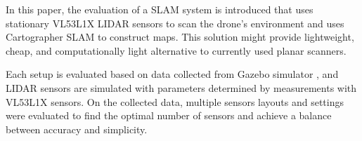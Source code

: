 \documentclass[conference]{IEEEtran}
\begin{document}
In this paper, the evaluation of a SLAM system is introduced that uses stationary VL53L1X LIDAR sensors to scan
the drone's environment and uses Cartographer SLAM to construct maps. This solution might provide lightweight,
cheap, and computationally light alternative to currently used planar scanners. 

Each setup is evaluated based on data collected from Gazebo simulator \cite{GazeboWebsite}, and LIDAR sensors are simulated with 
parameters determined by measurements with VL53L1X sensors. On the collected data, multiple sensors layouts and 
settings were evaluated to find the optimal number of sensors and achieve a balance between accuracy and simplicity.


%
%



%
%
\end{document}
